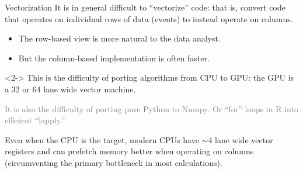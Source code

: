 \documentclass{beamer}
\begin{document}
\begin{frame}{Vectorization}
\vspace{0.5 cm}
It is in general difficult to ``vectorize'' code: that is, convert code that operates on individual rows of data (events) to instead operate on columns.
\begin{itemize}
\item The row-based view is more natural to the data analyst.
\item But the column-based implementation is often faster.
\end{itemize}

\vspace{0.5 cm}
\begin{uncoverenv}<2->
This is the difficulty of porting algorithms from CPU to GPU: the GPU is a 32 or 64 lane wide vector machine.

\vspace{0.2 cm}
\textcolor{gray}{It is also the difficulty of porting pure Python to Numpy. Or ``for'' loops in R into efficient ``lapply.''}

\vspace{0.5 cm}
Even when the CPU is the target, modern CPUs have $\sim$4 lane wide vector registers and can prefetch memory better when operating on columns (circumventing the primary bottleneck in most calculations).
\end{uncoverenv}
\end{frame}
\end{document}
